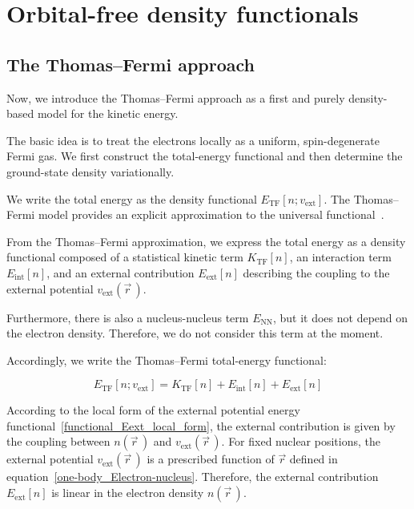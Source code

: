 \newpage
\section{Orbital-free density functionals}
\label{sec:appendix_thomas_fermi}

\subsection{The Thomas--Fermi approach}

Now, we introduce the Thomas--Fermi approach as a first and purely density-based model for the kinetic energy.

The basic idea is to treat the electrons locally as a uniform, spin-degenerate Fermi gas.
We first construct the total-energy functional and then determine the ground-state density variationally.

We write the total energy as the density functional $E_{\mathrm{TF}}[n;v_\mathrm{ext}]$.
The Thomas--Fermi model provides an explicit approximation to the universal functional~\cite{spruch1991pedagogic}.

From the Thomas--Fermi approximation, we express the total energy as a density functional composed of a statistical kinetic term $K_\mathrm{TF}[n]$, an interaction term $E_\mathrm{int}[n]$, and an external contribution $E_\mathrm{ext}[n]$ describing the coupling to the external potential $v_\mathrm{ext}(\vec{r}\,)$.

Furthermore, there is also a nucleus-nucleus term $E_\mathrm{NN}$, but it does not depend on the electron density. Therefore, we do not consider this term at the moment.

Accordingly, we write the Thomas--Fermi total-energy functional:

\begin{equation}
    E_{\mathrm{TF}}[n;v_\mathrm{ext}] = K_\mathrm{TF}[n] + E_\mathrm{int}[n] + E_\mathrm{ext}[n]
\label{TF_total_energy_functional}
\end{equation}

According to the local form of the external potential energy functional~\eqref{functional_Eext_local_form}, the external contribution is given by the coupling between $n(\vec{r}\,)$ and $v_\mathrm{ext}(\vec{r}\,)$.
For fixed nuclear positions, the external potential $v_\mathrm{ext}(\vec{r}\,)$ is a prescribed function of $\vec{r}$ defined in equation~\eqref{one-body_Electron-nucleus}. Therefore, the external contribution $E_\mathrm{ext}[n]$ is linear in the electron density $n(\vec{r}\,)$.

